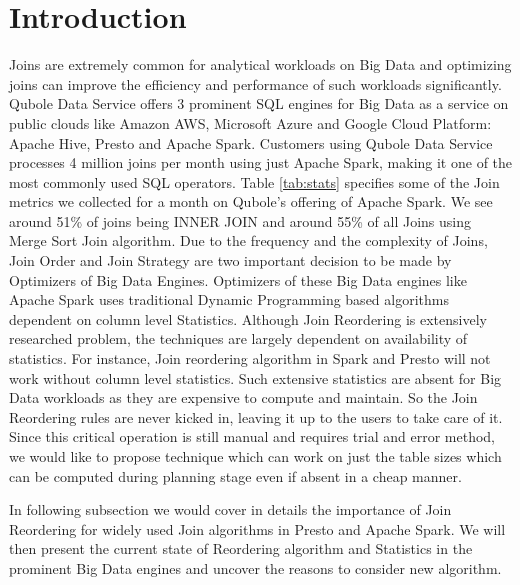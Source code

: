 \documentclass[conference]{IEEEtran}
\begin{document}
\section{Introduction}
Joins are extremely common for analytical workloads on Big Data and optimizing joins can improve the efficiency and performance of such workloads significantly. Qubole Data Service offers 3 prominent SQL engines for Big Data as a service on public clouds like Amazon AWS, Microsoft Azure and Google Cloud Platform: Apache Hive, Presto and Apache Spark. Customers using Qubole Data Service processes 4 million joins per month using just Apache Spark, making it one of the most commonly used SQL operators. Table \ref{tab:stats} specifies some of the Join metrics we collected for a month on Qubole's offering of Apache Spark. We see around 51\% of joins being INNER JOIN and around 55\% of all Joins using Merge Sort Join algorithm. Due to the frequency and the complexity of Joins, Join Order and Join Strategy are two important decision to be made by Optimizers of Big Data Engines. Optimizers of these Big Data engines like Apache Spark uses traditional Dynamic Programming based algorithms \cite{b1} dependent on column level Statistics. Although Join Reordering is extensively researched problem, the techniques are largely dependent on availability of statistics. For instance, Join reordering algorithm in Spark and Presto will not work without column level statistics. Such extensive statistics are absent for Big Data workloads as they are expensive to compute and maintain. So the Join Reordering rules are never kicked in, leaving it up to the users to take care of it. Since this critical operation is still manual and requires trial and error method, we would like to propose technique which can work on just the table sizes which can be computed during planning stage even if absent in a cheap manner.

In following subsection we would cover in details the importance of Join Reordering for widely used Join algorithms in Presto and Apache Spark. We will then present the current state of Reordering algorithm and Statistics in the prominent Big Data engines and uncover the reasons to consider new algorithm.
\end{document}
